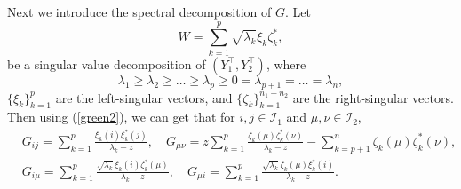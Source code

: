  
Next we introduce the spectral decomposition of $G$. Let
$$W= \sum_{k = 1}^{p} {\sqrt {\lambda_k} \xi_k } \zeta _{k}^* ,$$
be a singular value decomposition of $(Y_1^\top, Y_2^\top)$, where
$$\lambda_1\ge \lambda_2 \ge \ldots \ge \lambda_{p} \ge 0 = \lambda_{p+1} = \ldots = \lambda_{n},$$
$\{\xi_{k}\}_{k=1}^{p}$ are the left-singular vectors, and $\{\zeta_{k}\}_{k=1}^{n_1+n_2}$ are the right-singular vectors.
Then using (\ref{green2}), we can get that for $i,j\in \mathcal I_1$ and $\mu,\nu\in \mathcal I_2$,
\begin{align}
& G_{ij} = \sum_{k = 1}^{p} \frac{\xi_k(i) \xi_k^*(j)}{\lambda_k-z}, \quad G_{\mu\nu} = 
z\sum_{k = 1}^{p} \frac{\zeta_k(\mu) \zeta_k^*(\nu)}{\lambda_k-z} - \sum_{k = p+1}^{n}  \zeta_k(\mu) \zeta_k^*(\nu) , \label{spectral1}\\
& G_{i\mu} = \sum_{k = 1}^{p} \frac{\sqrt{\lambda_k}\xi_k(i) \zeta_k^*(\mu)}{\lambda_k-z},  \quad G_{\mu i} = \sum_{k = 1}^{p} \frac{\sqrt{\lambda_k}\zeta_k(\mu) \xi_k^*(i)}{\lambda_k-z}.\label{spectral2}
\end{align}

 

